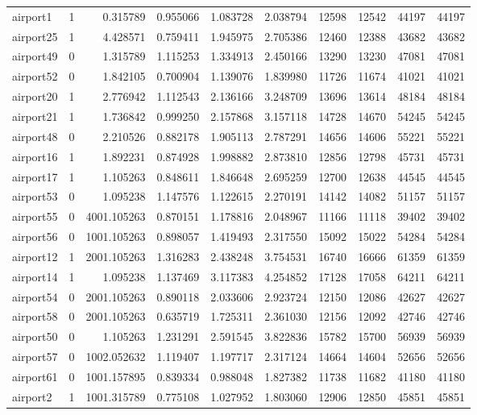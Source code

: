 \begin{longtable}{|l|r|r|r|r|r|r|r|r|r|}
airport1 & 1 & 0.315789 & 0.955066 & 1.083728 & 2.038794 & 12598 & 12542 & 44197 & 44197 \\
airport25 & 1 & 4.428571 & 0.759411 & 1.945975 & 2.705386 & 12460 & 12388 & 43682 & 43682 \\
airport49 & 0 & 1.315789 & 1.115253 & 1.334913 & 2.450166 & 13290 & 13230 & 47081 & 47081 \\
airport52 & 0 & 1.842105 & 0.700904 & 1.139076 & 1.839980 & 11726 & 11674 & 41021 & 41021 \\
airport20 & 1 & 2.776942 & 1.112543 & 2.136166 & 3.248709 & 13696 & 13614 & 48184 & 48184 \\
airport21 & 1 & 1.736842 & 0.999250 & 2.157868 & 3.157118 & 14728 & 14670 & 54245 & 54245 \\
airport48 & 0 & 2.210526 & 0.882178 & 1.905113 & 2.787291 & 14656 & 14606 & 55221 & 55221 \\
airport16 & 1 & 1.892231 & 0.874928 & 1.998882 & 2.873810 & 12856 & 12798 & 45731 & 45731 \\
airport17 & 1 & 1.105263 & 0.848611 & 1.846648 & 2.695259 & 12700 & 12638 & 44545 & 44545 \\
airport53 & 0 & 1.095238 & 1.147576 & 1.122615 & 2.270191 & 14142 & 14082 & 51157 & 51157 \\
airport55 & 0 & 4001.105263 & 0.870151 & 1.178816 & 2.048967 & 11166 & 11118 & 39402 & 39402 \\
airport56 & 0 & 1001.105263 & 0.898057 & 1.419493 & 2.317550 & 15092 & 15022 & 54284 & 54284 \\
airport12 & 1 & 2001.105263 & 1.316283 & 2.438248 & 3.754531 & 16740 & 16666 & 61359 & 61359 \\
airport14 & 1 & 1.095238 & 1.137469 & 3.117383 & 4.254852 & 17128 & 17058 & 64211 & 64211 \\
airport54 & 0 & 2001.105263 & 0.890118 & 2.033606 & 2.923724 & 12150 & 12086 & 42627 & 42627 \\
airport58 & 0 & 2001.105263 & 0.635719 & 1.725311 & 2.361030 & 12156 & 12092 & 42746 & 42746 \\
airport50 & 0 & 1.105263 & 1.231291 & 2.591545 & 3.822836 & 15782 & 15700 & 56939 & 56939 \\
airport57 & 0 & 1002.052632 & 1.119407 & 1.197717 & 2.317124 & 14664 & 14604 & 52656 & 52656 \\
airport61 & 0 & 1001.157895 & 0.839334 & 0.988048 & 1.827382 & 11738 & 11682 & 41180 & 41180 \\
airport2 & 1 & 1001.315789 & 0.775108 & 1.027952 & 1.803060 & 12906 & 12850 & 45851 & 45851 \\

\end{longtable}
